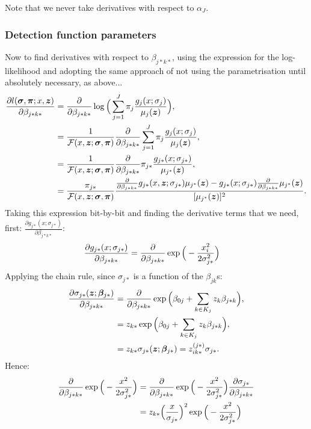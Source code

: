 Note that we never take derivatives with respect to $\alpha_J$.


\subsubsection{Detection function parameters}

Now to find derivatives with respect to $\beta_{j*k*}$, using the expression for the log-likelihood and adopting the same approach of not using the parametrisation until absolutely necessary, as above...
\begin{align*}
\frac{\partial l(\bm{\sigma},\bm{\pi};x, \bm{z})}{\partial \beta_{j*k*}} &= \frac{\partial}{\partial \beta_{j*k*}} \log\Big(\sum_{j=1}^J \pi_j \frac{g_j(x;\sigma_j)}{\mu_j(\bm{z})}\Big),\\
&= \frac{1}{\mathcal{F}(x,\bm{z};\bm{\sigma},\bm{\pi})} \frac{\partial}{\partial \beta_{j*k*}} \sum_{j=1}^J \pi_j \frac{g_j(x;\sigma_{j})}{\mu_j(\bm{z})},\\
&= \frac{1}{\mathcal{F}(x,\bm{z};\bm{\sigma},\bm{\pi})} \frac{\partial}{\partial \beta_{j*k*}} \pi_{j*} \frac{g_{j*}(x;\sigma_{j*})}{\mu_{j^*}(\bm{z})},\\
&= \frac{\pi_{j*}}{\mathcal{F}(x,\bm{z};\bm{\sigma},\bm{\pi})} \frac{\frac{\partial}{\partial \beta_{j*k*}} g_{j*}(x,\bm{z};\sigma_{j*}) \mu_{j^*}(\bm{z}) - g_{j*}(x;\sigma_{j*}) \frac{\partial}{\partial \beta_{j*k*}} \mu_{j^*}(\bm{z})}{[\mu_{j^*}(\bm{z})]^2}.\\
\end{align*}
Taking this expression bit-by-bit and finding the derivative terms that we need, first: $\frac{\partial g_{j*}(x;\sigma_{j*})}{\partial \beta_{j*k*}}$:
\begin{align*}
\frac{\partial g_{j*}(x;\sigma_{j*})}{\partial \beta_{j*k*}} &= \frac{\partial}{\partial \beta_{j*k*}} \exp\Big( -\frac{x_i^2}{2\sigma_{j*}^2} \Big)
\end{align*}
Applying the chain rule, since $\sigma_{j*}$ is a function of the $\beta_{jk}$s:
\begin{align*}
\frac{\partial \sigma_{j*}(\bm{z};\bm{\beta}_{j*})}{\partial \beta_{j*k*}} &= \frac{\partial}{\partial \beta_{j*k*}}\exp \Big( \beta_{0j} + \sum_{k\in K_j} z_k \beta_{j*k}\Big),\\
&= z_{k*} \exp \Big( \beta_{0j} + \sum_{k \in K_j} z_{k} \beta_{j*k}\Big),\\
&= z_{k*}\sigma_{j*}(\bm{z};\bm{\beta}_{j*}) = z^{(j*)}_{ik*}\sigma_{j*}.
\end{align*}
Hence:
\begin{align*}
 \frac{\partial}{\partial \beta_{j*k*}} \exp\Big( -\frac{x^2}{2\sigma_{j*}^2} \Big) &=  \frac{\partial}{\partial \beta_{j*k*}} \exp\Big( -\frac{x^2}{2\sigma_{j*}^2} \Big)  \frac{\partial \sigma_{j*}}{\partial \beta_{j*k*}}\\
&= z_{k*} \Big( \frac{x}{\sigma_{j*}}\Big)^2 \exp \Big(-\frac{x^2}{2 \sigma_{j*}^2}\Big) 
\end{align*}

